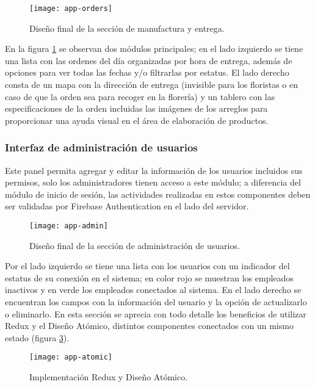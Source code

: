 \begin{figure}[H]
  \centering
  \texttt{[image: app-orders]}
  \caption{Diseño final de la sección de manufactura y entrega.}
  \label{production-ui}
\end{figure}

En la figura \ref{production-ui} se observan dos módulos principales; en el lado izquierdo se tiene una lista con las ordenes del día organizadas por hora de entrega, además de opciones para ver todas las fechas y/o filtrarlas por estatus. El lado derecho consta de un mapa con la dirección de entrega (invisible para los floristas o en caso de que la orden sea para recoger en la florería) y un tablero con las especificaciones de la orden incluidas las imágenes de los arreglos para proporcionar una ayuda visual en el área de elaboración de productos.
\vspace{0.8cm}

\subsubsection{Interfaz de administración de usuarios}
Este panel permita agregar y editar la información de los usuarios incluidos sus permisos, solo los administradores tienen acceso a este módulo; a diferencia del módulo de inicio de sesión, las actividades realizadas en estos componentes deben ser validadas por Firebase Authentication en el lado del servidor.
\vspace{0.8cm}

\begin{figure}[H]
  \centering
  \texttt{[image: app-admin]}
  \caption{Diseño final de la sección de administración de usuarios.}
  \label{admin-ui}
\end{figure}

Por el lado izquierdo se tiene una lista con los usuarios con un indicador del estatus de su conexión en el sistema; en color rojo se muestran los empleados inactivos y en verde los empleados conectados al sistema. En el lado derecho se encuentran los campos con la información del usuario y la opción de actualizarlo o eliminarlo. En esta sección se aprecia con todo detalle los beneficios de utilizar Redux y el Diseño Atómico, distintos componentes conectados con un mismo estado (figura \ref{admin-atomic}).
\vspace{0.8cm}

\begin{figure}[H]
  \centering
  \texttt{[image: app-atomic]}
  \caption{Implementación Redux y Diseño Atómico.}
  \label{admin-atomic}
\end{figure}

